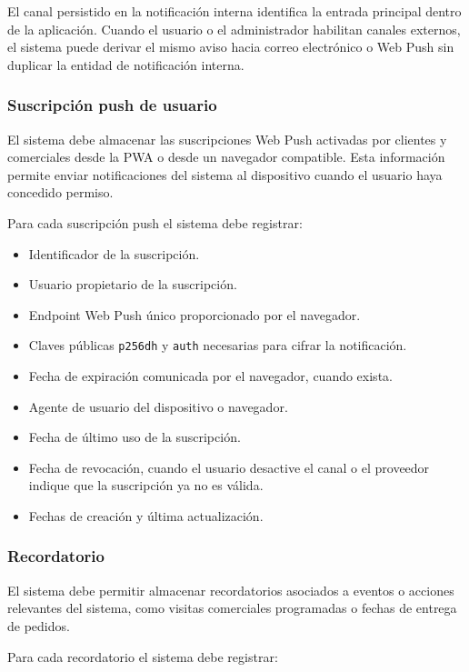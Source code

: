 El canal persistido en la notificación interna identifica la entrada principal dentro de la aplicación. Cuando el usuario o el administrador habilitan canales externos, el sistema puede derivar el mismo aviso hacia correo electrónico o Web Push sin duplicar la entidad de notificación interna.

\subsubsection*{Suscripción push de usuario}

El sistema debe almacenar las suscripciones Web Push activadas por clientes y comerciales desde la PWA o desde un navegador compatible. Esta información permite enviar notificaciones del sistema al dispositivo cuando el usuario haya concedido permiso.

Para cada suscripción push el sistema debe registrar:

\begin{itemize}
    \item Identificador de la suscripción.
    \item Usuario propietario de la suscripción.
    \item Endpoint Web Push único proporcionado por el navegador.
    \item Claves públicas \texttt{p256dh} y \texttt{auth} necesarias para cifrar la notificación.
    \item Fecha de expiración comunicada por el navegador, cuando exista.
    \item Agente de usuario del dispositivo o navegador.
    \item Fecha de último uso de la suscripción.
    \item Fecha de revocación, cuando el usuario desactive el canal o el proveedor indique que la suscripción ya no es válida.
    \item Fechas de creación y última actualización.
\end{itemize}

\subsubsection*{Recordatorio}

El sistema debe permitir almacenar recordatorios asociados a eventos o acciones relevantes del sistema, como visitas comerciales programadas o fechas de entrega de pedidos.

Para cada recordatorio el sistema debe registrar:

